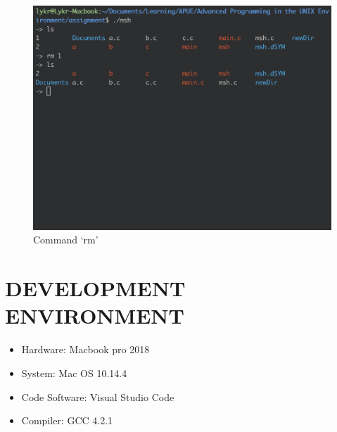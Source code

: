 \documentclass{article}
\begin{document}
\begin{figure}[h]
\centering
\includegraphics[scale=0.4]{fig/v5-4.png}
\caption{Command `rm'}
\end{figure}

\newpage
\section{DEVELOPMENT ENVIRONMENT}

\begin{itemize}
\item Hardware: Macbook pro 2018
\item System: Mac OS 10.14.4
\item Code Software: Visual Studio Code
\item Compiler: GCC 4.2.1
\end{itemize}
\end{document}
